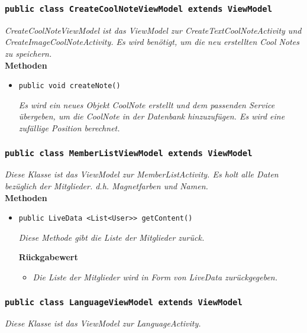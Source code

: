            		\subsubsection{\texttt{public class CreateCoolNoteViewModel extends ViewModel}}
        \textit{CreateCoolNoteViewModel ist das ViewModel zur CreateTextCoolNoteActivity und CreateImageCoolNoteActivity. Es wird benötigt, um die neu erstellten Cool Notes zu speichern.}\\
        
		\textbf{Methoden}
 			\begin{itemize}
        		\item\texttt{{public void createNote()}}
        	
        		\textit{Es wird ein neues Objekt CoolNote erstellt und dem passenden Service übergeben, um die CoolNote in der Datenbank hinzuzufügen. Es wird eine zufällige Position berechnet.}
        	
       		\end{itemize}
       		 
           		\subsubsection{\texttt{public class MemberListViewModel extends ViewModel}}
        \textit{Diese Klasse ist das ViewModel zur MemberListActivity. Es holt alle Daten bezüglich der Mitglieder. d.h. Magnetfarben und Namen.}\\
        
		\textbf{Methoden}
 			\begin{itemize}
        		\item\texttt{{public LiveData <List<User>> getContent()}}
        	
        		\textit{Diese Methode gibt die Liste der Mitglieder zurück.}
        		
        	\textbf{Rückgabewert}
        	\begin{itemize}
				\item\textit{Die Liste der Mitglieder wird in Form von LiveData zurückgegeben.}
       		\end{itemize}
       	
       		\end{itemize}
       		 
       		   \subsubsection{\texttt{public class LanguageViewModel extends ViewModel}}
        \textit{Diese Klasse ist das ViewModel zur LanguageActivity.}\\
        
